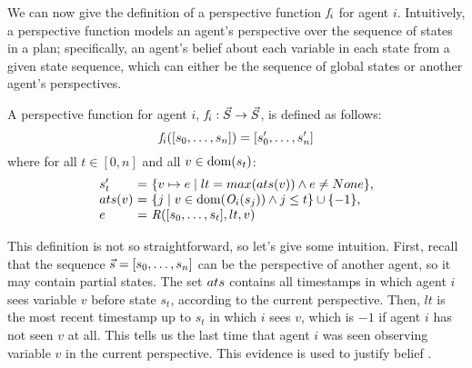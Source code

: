 We can now give the definition of a perspective function $\mathit{f}_i$ for agent $i$.
Intuitively, a perspective function models an agent's perspective over the sequence of states in a plan; specifically, an agent's belief about each variable in each state from a given state sequence, which can either be the sequence of global states or another agent's perspectives.

\begin{definition}
    
    \label{def:perspective_function}
    A perspective function for agent $i$, $\mathit{f}_i: \vec{S} \rightarrow \vec{S}$, is defined as follows:
    \[
    \mathit{f}_i([s_0,\dots,s_n])=[s'_0,\dots,s'_n] 
    \]
\noindent
    where for all $t \in [0, n]$ and all $v \in \textrm{dom}(s_t)$:
    \[
    \begin{array}{l@{\ }l@{\ }l}
    s'_t            & = & \{v \mapsto e \mid lt = max(a\timestamp(v)) \land e \neq None\} \text{,} \\
    a\timestamp(v)  & = & \{j \mid v \in \dom(\observation_i(s_j)) \land j \leq t \} \cup \{ -1\} \text{,}\\
    e               & = & \memorization([s_0,\dots,s_t],lt,v)
    \end{array}
    \]




\end{definition}

This definition is not so straightforward, so let's give some intuition. First, recall that the sequence $\Vec{s} = [s_0,\ldots, s_n]$ can be the perspective of another agent, so it may contain partial states. The set $ats$ contains all timestamps in which agent $i$ sees  variable $v$ before state $s_t$, according to the current perspective. Then, $lt$ is the most recent timestamp up to $s_t$ in which $i$ sees $v$, which is $-1$ if agent $i$ has not seen $v$ at all. This tells us the last time that agent $i$ was seen observing variable $v$ in the current perspective. This evidence is used to justify belief \cite{goldman1979justified}.

